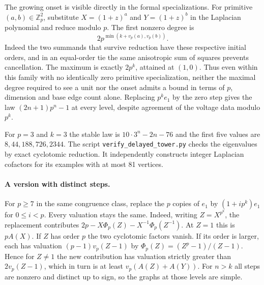 The growing onset is visible directly in the formal specializations.
For primitive $(a,b)\in\mathbb Z_p^2$, substitute $X=(1+z)^a$ and
$Y=(1+z)^b$ in the Laplacian polynomial and reduce modulo $p$.
The first nonzero degree is
\[
 2p^{\min(k+v_p(a),v_p(b))}.
\]
Indeed the two summands that survive reduction have these respective
initial orders, and in an equal-order tie the same anisotropic sum of
squares prevents cancellation. The maximum is exactly $2p^k$, attained
at $(1,0)$. Thus even within this family with no identically zero
primitive specialization, neither the maximal degree required to see a
unit nor the onset admits a bound in terms of $p$, dimension and base
edge count alone. Replacing $p^k e_1$ by the zero step gives the law
$(2n+1)p^n-1$ at every level, despite agreement of the voltage data
modulo $p^k$.

For $p=3$ and $k=3$ the stable law is $10\cdot3^n-2n-76$ and the first
five values are $8,44,188,726,2344$. The script
\texttt{verify\_delayed\_tower.py} checks the eigenvalues by exact
cyclotomic reduction. It independently constructs integer Laplacian
cofactors for its examples with at most 81 vertices.

\paragraph{A version with distinct steps.}
For $p\ge7$ in the same congruence class, replace the $p$ copies of
$e_1$ by $(1+i p^k)e_1$ for $0\le i<p$. Every valuation stays the same.
Indeed, writing $Z=X^{p^k}$, the replacement contributes
$2p-X\Phi_p(Z)-X^{-1}\Phi_p(Z^{-1})$. At $Z=1$ this is $pA(X)$.
If $Z$ has order $p$ the two cyclotomic factors vanish. If its order is
larger, each has valuation $(p-1)v_p(Z-1)$ by
$\Phi_p(Z)=(Z^p-1)/(Z-1)$. Hence for $Z\ne1$ the new contribution has
valuation strictly greater than $2v_p(Z-1)$, which in turn is at least
$v_p(A(Z)+A(Y))$. For $n>k$ all steps are nonzero and distinct up to
sign, so the graphs at those levels are simple.

